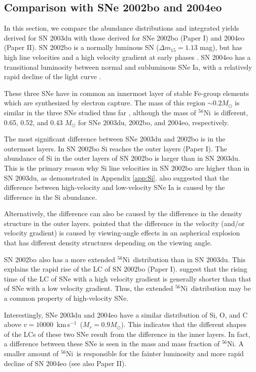 \documentclass[usegraphicx,usenatbib]{mn2e}
\newcommand{\kms}{\mbox{\,km\,s$^{-1}$}}
\newcommand{\Msun}{M_{\odot}}
\newcommand{\Nifs}{$^{56}$Ni}
\begin{document}
\subsection{Comparison with SNe 2002bo and 2004eo}

In this section, we compare the abundance distributions and 
integrated yields derived for SN 2003du with those derived for 
SNe 2002bo (Paper I) and 2004eo (Paper II).
SN 2002bo is a normally luminous SN ($\Delta m_{15} = 1.13$ mag), 
but has high line velocities 
and a high velocity gradient at early phases \citep{benetti04}.
SN 2004eo has a transitional luminosity between normal and 
subluminous SNe Ia, with a relatively rapid decline of the light curve
\citep[$\Delta m_{15} = 1.46$ mag,][]{pastorello07}.

These three SNe have in common an innermost layer of stable Fe-group elements
which are synthesized by electron capture. The mass of this region $\sim 0.2
\Msun$ is similar in the  three SNe studied thus far \citep[see
also][]{mazzali07Ia}, although the mass of \Nifs\ is different, 0.65, 0.52, and
0.43 $\Msun$ for SNe 2003du, 2002bo, and 2004eo, respectively.

The most significant difference between SNe 2003du and 2002bo is in the
outermost layers.  In SN 2002bo Si reaches the outer layers (Paper I).  The
abundance of Si in the outer layers of SN 2002bo is larger than in SN 2003du. 
This is the primary reason why Si line velocities in SN 2002bo are higher than
in SN 2003du, as demonstrated in Appendix \ref{app:Si}.  \citet{tanaka08Ia}
also suggested that the difference between  high-velocity and low-velocity SNe
Ia is caused by the difference in the Si abundance.

Alternatively, the difference can also be caused by the difference in the
density structure in the outer layers. \citet{maeda10nat} pointed that the
difference in the velocity  (and/or velocity gradient) is caused by
viewing-angle effects in an aspherical explosion that has different density
structures depending on the viewing angle.

SN 2002bo also has a more extended \Nifs\ distribution than in SN 2003du. This
explains the rapid rise of the LC of SN 2002bo (Paper I). \citet{pignata08}
suggest that the rising time of the LC of  SNe with a high velocity gradient is
generally shorter than that  of SNe with a low velocity gradient. Thus, the
extended \Nifs\ distribution may be a common property of high-velocity SNe.

Interestingly, SNe 2003du and 2004eo have a similar distribution 
of Si, O, and C above $v=10000$ \kms\ ($M_r = 0.9 \Msun$).
This indicates that the different shapes of the LCs of these
two SNe result from the difference in the inner layers.
In fact, a difference between these SNe is seen in the mass 
and mass fraction of \Nifs.
A smaller amount of \Nifs\ is responsible for the fainter luminosity 
and more rapid decline of SN 2004eo (see also Paper II).
\end{document}
